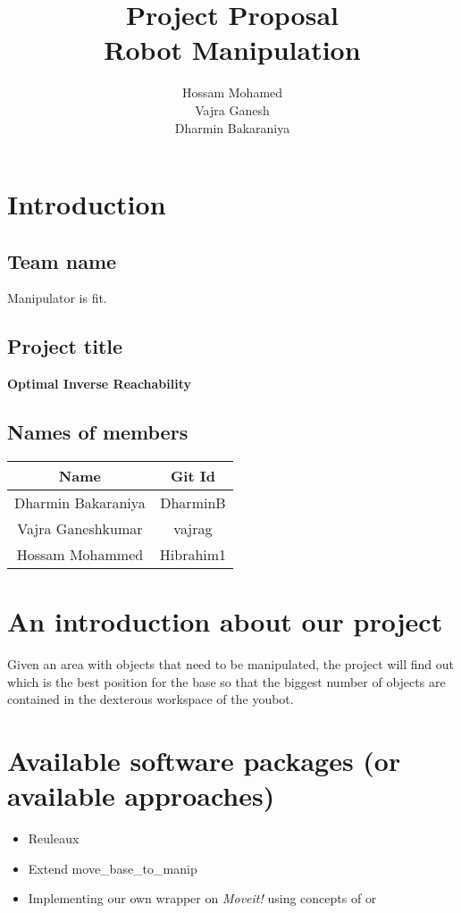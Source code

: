\documentclass[12pt]{article}
\title{Project Proposal\\Robot Manipulation}
\author{Hossam Mohamed \\ Vajra Ganesh \\Dharmin Bakaraniya}
\begin{document}
\maketitle{}
\section{Introduction}
\subsection{Team name}
Manipulator is fit.
\subsection{Project title}
\textbf{Optimal Inverse Reachability}
\subsection{Names of members}
\begin{table}[htpb]
        \centering
        \begin{tabular}{|c|c|}
                \hline
                \textbf{Name} & \textbf{Git Id}\\\hline
                Dharmin Bakaraniya & DharminB\\\hline
                Vajra Ganeshkumar & vajrag\\\hline
                Hossam Mohammed & Hibrahim1\\\hline
        \end{tabular}
\end{table}

\section{An introduction about our project}
Given an area with objects that need to be manipulated, the project will find out which
is the best position for the base so that the biggest number of
objects are contained in the dexterous workspace of the
youbot.


\section{Available software packages (or available approaches)}
\begin{itemize}
        \item Reuleaux\cite{makhal}\cite{reuleaux}
        \item Extend move\_base\_to\_manip\cite{movebasetomanip}
        \item Implementing our own wrapper on \textit{Moveit!} using concepts of \cite{malek} \cite{park} or \cite{rastegar}
\end{itemize}
\end{document}
